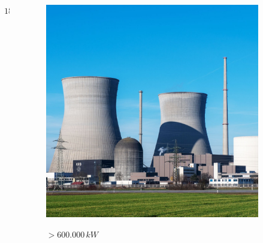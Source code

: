 \documentclass[handout]{beamer}
\theoremstyle{plain}
\begin{document}
\begin{frame}
\begin{columns}
\begin{column}{0.25\textwidth}
\begin{figure}
    $ 1875 \, W $
  \end{figure}    
  \end{column}
  \begin{column}{0.25\textwidth}
  \begin{figure}
    \includegraphics[width=\columnwidth]{img/centrale.jpg}

    $ > 600.000 \, kW $
  \end{figure}    
  \end{column}
\end{columns}
\end{frame}
\end{document}
